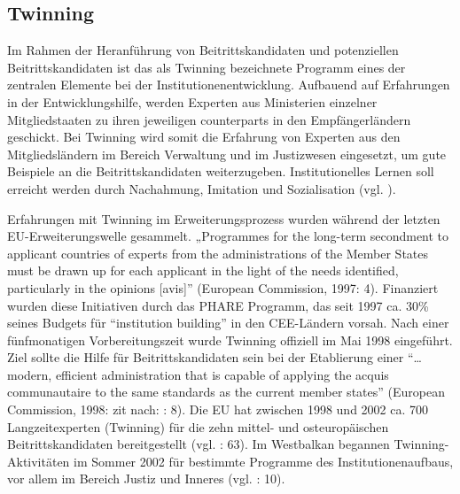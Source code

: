 \subsection{Twinning}
Im Rahmen der Heranführung von Beitrittskandidaten und potenziellen Beitrittskandidaten ist das als Twinning bezeichnete Programm eines der zentralen Elemente bei der Institutionenentwicklung. Aufbauend auf Erfahrungen in der Entwicklungshilfe, werden Experten aus Ministerien einzelner Mitgliedstaaten zu ihren jeweiligen counterparts in den Empfängerländern geschickt. Bei Twinning wird somit die Erfahrung von Experten aus den Mitgliedsländern im Bereich Verwaltung und im Justizwesen eingesetzt, um gute Beispiele an die Beitrittskandidaten weiterzugeben. Institutionelles Lernen soll erreicht werden durch Nachahmung, Imitation und Sozialisation (vgl. \cite{tulmets05}).
\par
Erfahrungen mit Twinning im Erweiterungsprozess wurden während der letzten EU-Erweiterungswelle gesammelt. „Programmes for the long-term secondment to applicant countries of experts from the administrations of the Member States must be drawn up for each applicant in the light of the needs identified, particularly in the opinions [avis]” (European Commission, 1997: 4). Finanziert wurden diese Initiativen durch das PHARE Programm, das seit 1997 ca. 30\% seines Budgets für “institution building” in den CEE-Ländern vorsah. Nach einer fünfmonatigen Vorbereitungszeit wurde Twinning offiziell im Mai 1998 eingeführt. Ziel sollte die Hilfe für Beitrittskandidaten sein bei der Etablierung einer “…modern, efficient administration that is capable of applying the acquis communautaire to the same standards as the current member states” (European Commission, 1998: zit nach: \cite{papadi} : 8). Die EU hat zwischen 1998 und 2002 ca. 700 Langzeitexperten (Twinning) für die zehn mittel- und osteuropäischen Beitrittskandidaten bereitgestellt (vgl. \cite{lipumb04} : 63). Im Westbalkan begannen Twinning-Aktivitäten im Sommer 2002 für bestimmte Programme des Institutionenaufbaus, vor allem im Bereich Justiz und Inneres (vgl. \cite{euko07} : 10).\par

